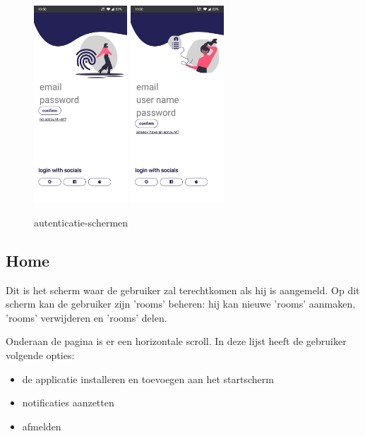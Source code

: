 		
		\begin{figure}[H]
			\centering
			\includegraphics[width=35mm]{./img/POC/login.jpg}{}		\includegraphics[width=35mm]{./img/POC/register.jpg}{}
			\caption{autenticatie-schermen}
		\end{figure}
		
		
		\newpage
	\subsection{Home}
		Dit is het scherm waar de gebruiker zal terechtkomen als hij is aangemeld. 
		Op dit scherm kan de gebruiker zijn 'rooms' beheren: hij kan nieuwe 'rooms' aanmaken, 'rooms' verwijderen en 'rooms' delen.
		
		Onderaan de pagina is er een horizontale scroll. In deze lijst heeft de gebruiker volgende opties:
		\begin{itemize}
			\item de applicatie installeren en toevoegen aan het startscherm
			\item notificaties aanzetten 
			\item afmelden
		\end{itemize}
		
